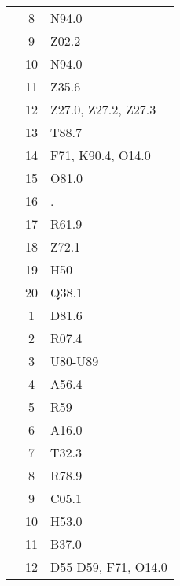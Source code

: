 \begin{table}[htbp]
\begin{tabular}{c c l}
	 & 8 & N94.0 \\
	 & 9 & Z02.2 \\
	 & 10 & N94.0 \\
	 & 11 & Z35.6 \\
	 & 12 & Z27.0, Z27.2, Z27.3 \\
	 & 13 & T88.7 \\
	 & 14 & F71, K90.4, O14.0 \\
	 & 15 & O81.0 \\
	 & 16 & . \\
	 & 17 & R61.9 \\
	 & 18 & Z72.1 \\
	 & 19 & H50 \\
	 & 20 & Q38.1 \\
	\addlinespace
	8 & 1 & D81.6 \\
	 & 2 & R07.4 \\
	 & 3 & U80-U89 \\
	 & 4 & A56.4 \\
	 & 5 & R59 \\
	 & 6 & A16.0 \\
	 & 7 & T32.3 \\
	 & 8 & R78.9 \\
	 & 9 & C05.1 \\
	 & 10 & H53.0 \\
	 & 11 & B37.0 \\
	 & 12 & D55-D59, F71, O14.0 \\
	\bottomrule
\end{tabular}
\end{table}


